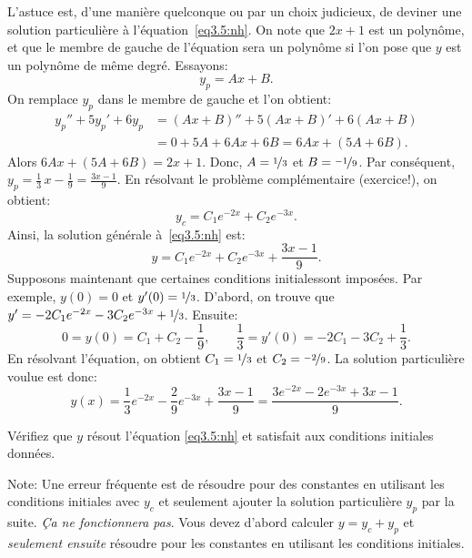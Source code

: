 L'astuce est, d'une manière quelconque ou par un choix judicieux, de deviner une solution particulière à 
l'équation~\eqref{eq3.5:nh}.  On note que $2x+1$ est un polynôme, et que le membre de gauche de l'équation sera un polynôme si l'on pose que $y$ est un polynôme de même degré. Essayons: 
\begin{equation*}
y_p = Ax + B .
\end{equation*}
On remplace $y_p$ dans le membre de gauche et l'on obtient: 
\begin{equation*}
\begin{split}
y_p'' + 5y_p'+ 6y_p & =
(Ax+B)'' + 5(Ax+B)' + 6(Ax+B)
\\
& = 
0 + 5A + 6Ax + 6B = 6Ax+ (5A+6B) .
\end{split}
\end{equation*}
Alors $6Ax+(5A+6B) = 2x+1$.  Donc, $A = \nicefrac{1}{3}$ et $B = \nicefrac{-1}{9}$.
Par conséquent, 
$y_p = \frac{1}{3}\, x - \frac{1}{9} = \frac{3x-1}{9}$.
En résolvant le problème complémentaire (exercice!), on obtient: 
\begin{equation*}
y_c = C_1 e^{-2x} + C_2 e^{-3x}.
\end{equation*}
Ainsi, la solution générale à~\eqref{eq3.5:nh} est: 
\begin{equation*}
y = C_1 e^{-2x} + C_2 e^{-3x} + \frac{3x-1}{9} .
\end{equation*}
Supposons maintenant que certaines conditions initialessont imposées. Par exemple,  $y(0) = 0$ et
$y'(0) = \nicefrac{1}{3}$.  D'abord, on trouve que $y' = - 2C_1 e^{-2x} - 3C_2 e^{-3x}
+ \nicefrac{1}{3}$.
Ensuite: 
\begin{equation*}
0 = y(0) = C_1 + C_2 -\frac{1}{9} , \qquad
\frac{1}{3} = y'(0) = - 2C_1 - 3C_2 + \frac{1}{3} .
\end{equation*}
En résolvant l'équation, on obtient $C_1 = \nicefrac{1}{3}$ et $C_2 = \nicefrac{-2}{9}$.
La solution particulière voulue est donc:  
\begin{equation*}
y(x) = \frac{1}{3} e^{-2x} - \frac{2}{9} e^{-3x} + \frac{3x-1}{9} =
\frac{3 e^{-2x} - 2 e^{-3x} + 3x-1}{9} .
\end{equation*}

\begin{exercise}
Vérifiez que $y$ résout  l'équation  \eqref{eq3.5:nh}
et satisfait aux conditions initiales données.  
\end{exercise}

Note: Une erreur fréquente est de résoudre pour des constantes en utilisant les conditions initiales avec  $y_c$ et seulement ajouter la solution particulière $y_p$ par la suite.
 \emph{Ça ne fonctionnera pas}.  Vous devez d'abord calculer $y = y_c + y_p$ et
\emph{seulement ensuite} résoudre pour les constantes en utilisant les conditions initiales. 

